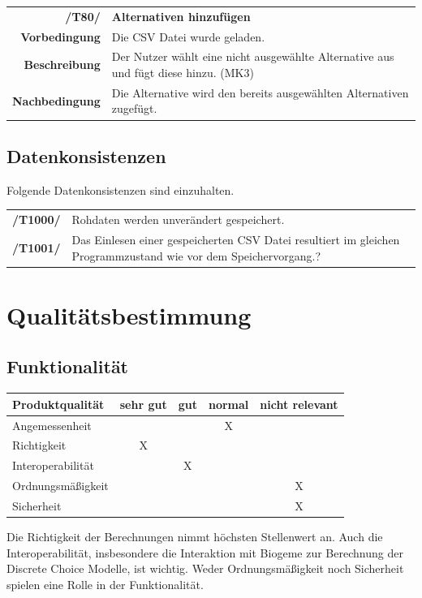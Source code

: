 \documentclass{article}
\begin{document}
\begin{table}[H]
\begin{tabularx}{\textwidth}{rX}
\textbf{/T80/}         & \textbf{Alternativen hinzufügen} \\
\textbf{Vorbedingung}  & Die CSV Datei wurde geladen.\\
\textbf{Beschreibung}  & Der Nutzer wählt eine nicht ausgewählte Alternative aus und fügt diese hinzu. (MK3) \\
\textbf{Nachbedingung} & Die Alternative wird den bereits ausgewählten Alternativen zugefügt.
\end{tabularx}
\end{table}


\subsection{Datenkonsistenzen}
Folgende Datenkonsistenzen sind einzuhalten.
\begin{table}[H]
\begin{tabularx}{\textwidth}{rX}
\textbf{/T1000/}        & Rohdaten werden unverändert gespeichert. \\              \textbf{/T1001/}        & Das Einlesen einer gespeicherten CSV Datei resultiert im gleichen Programmzustand wie vor dem Speichervorgang.? \\
\end{tabularx}
\end{table}

\section{Qualitätsbestimmung}
\subsection{Funktionalität}
\begin{table}[H]
\centering
\begin{tabular}{lcccc}
\hline
\textbf{Produktqualität} & sehr gut & gut & normal & nicht relevant \\ \hline
Angemessenheit           &          &     & X      &                \\
Richtigkeit              & X        &     &        &                \\
Interoperabilität        &          & X   &        &                \\
Ordnungsmäßigkeit        &          &     &        & X              \\
Sicherheit               &          &     &        & X              \\  
\end{tabular}
\end{table}
Die Richtigkeit der Berechnungen nimmt höchsten Stellenwert an. Auch die Interoperabilität, insbesondere die Interaktion mit Biogeme zur Berechnung der Discrete Choice Modelle, ist wichtig. Weder Ordnungsmäßigkeit noch Sicherheit spielen eine Rolle in der Funktionalität.
\end{document}
